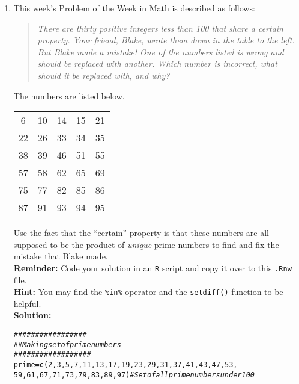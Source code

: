 \documentclass{article}\usepackage[]{graphicx}\usepackage[]{xcolor}
\makeatletter
\newcommand{\hlnum}[1]{\textcolor[rgb]{0.686,0.059,0.569}{#1}}%
\newcommand{\hlcom}[1]{\textcolor[rgb]{0.678,0.584,0.686}{\textit{#1}}}%
\newcommand{\hldef}[1]{\textcolor[rgb]{0.345,0.345,0.345}{#1}}%
\newcommand{\hlkwb}[1]{\textcolor[rgb]{0.69,0.353,0.396}{#1}}%
\newcommand{\hlkwd}[1]{\textcolor[rgb]{0.737,0.353,0.396}{\textbf{#1}}}%
\newenvironment{kframe}{%
 \def\at@end@of@kframe{}%
 \ifinner\ifhmode%
  \def\at@end@of@kframe{\end{minipage}}%
  \begin{minipage}{\columnwidth}%
 \fi\fi%
 \def\FrameCommand##1{\hskip\@totalleftmargin \hskip-\fboxsep
 \colorbox{shadecolor}{##1}\hskip-\fboxsep
     \hskip-\linewidth \hskip-\@totalleftmargin \hskip\columnwidth}%
 \MakeFramed {\advance\hsize-\width
   \@totalleftmargin\z@ \linewidth\hsize
   \@setminipage}}%
 {\par\unskip\endMakeFramed%
 \at@end@of@kframe}
\newenvironment{knitrout}{}{} %
\makeatother
\begin{document}
\begin{enumerate}
\item This week's Problem of the Week in Math is described as follows:
\begin{quotation}
  \textit{There are thirty positive integers less than 100 that share a certain 
  property. Your friend, Blake, wrote them down in the table to the left. But 
  Blake made a mistake! One of the numbers listed is wrong and should be replaced 
  with another. Which number is incorrect, what should it be replaced with, and 
  why?}
\end{quotation}
The numbers are listed below.
\begin{center}
  \begin{tabular}{ccccc}
    6 & 10 & 14 & 15 & 21\\
    22 & 26 & 33 & 34 & 35\\
    38 & 39 & 46 & 51 & 55\\
    57 & 58 & 62 & 65 & 69\\
    75 & 77 & 82 & 85 & 86\\
    87 & 91 & 93 & 94 & 95
  \end{tabular}
\end{center}
Use the fact that the ``certain'' property is that these numbers are all supposed
to be the product of \emph{unique} prime numbers to find and fix the mistake that
Blake made.\\
\textbf{Reminder:} Code your solution in an \texttt{R} script and copy it over
to this \texttt{.Rnw} file.\\
\textbf{Hint:} You may find the \verb|%in%| operator and the \verb|setdiff()| function to be helpful.\\

\textbf{Solution:} 

\begin{knitrout}\scriptsize
{}\color{fgcolor}\begin{kframe}
\begin{alltt}
\hlcom{#################}
\hlcom{## Making set of prime numbers}
\hlcom{##################}
\hldef{prime} \hlkwb{=} \hlkwd{c}\hldef{(}\hlnum{2}\hldef{,} \hlnum{3}\hldef{,} \hlnum{5}\hldef{,} \hlnum{7}\hldef{,} \hlnum{11}\hldef{,} \hlnum{13}\hldef{,} \hlnum{17}\hldef{,} \hlnum{19}\hldef{,} \hlnum{23}\hldef{,} \hlnum{29}\hldef{,} \hlnum{31}\hldef{,} \hlnum{37}\hldef{,} \hlnum{41}\hldef{,} \hlnum{43}\hldef{,} \hlnum{47}\hldef{,} \hlnum{53}\hldef{,}
          \hlnum{59}\hldef{,} \hlnum{61}\hldef{,} \hlnum{67}\hldef{,} \hlnum{71}\hldef{,} \hlnum{73}\hldef{,} \hlnum{79}\hldef{,} \hlnum{83}\hldef{,} \hlnum{89}\hldef{,} \hlnum{97}\hldef{)} \hlcom{#Set of all prime numbers under 100}


\end{alltt}
\end{kframe}
\end{knitrout}
\end{enumerate}
\end{document}
